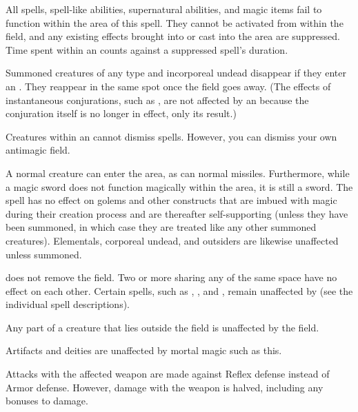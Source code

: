 \begin{spelleffect}
  All spells, spell-like abilities, supernatural abilities, and magic items fail to function within the area of this spell. They cannot be activated from within the field, and any existing effects brought into or cast into the area are suppressed. Time spent within an  counts against a suppressed spell's duration.
  \par Summoned creatures of any type and incorporeal undead disappear if they enter an . They reappear in the same spot once the field goes away. (The effects of instantaneous conjurations, such as , are not affected by an  because the conjuration itself is no longer in effect, only its result.)
  \par Creatures within an  cannot dismiss spells. However, you can dismiss your own antimagic field.
\end{spelleffect}
\begin{spellnotes}
  A normal creature can enter the area, as can normal missiles. Furthermore, while a magic sword does not function magically within the area, it is still a sword. The spell has no effect on golems and other constructs that are imbued with magic during their creation process and are thereafter self-supporting (unless they have been summoned, in which case they are treated like any other summoned creatures). Elementals, corporeal undead, and outsiders are likewise unaffected unless summoned.
  \par {} does not remove the field. Two or more  sharing any of the same space have no effect on each other. Certain spells, such as , , and , remain unaffected by  (see the individual spell descriptions).
  \par Any part of a creature that lies outside the field is unaffected by the field.
  \par Artifacts and deities are unaffected by mortal magic such as this. 
\end{spellnotes}

\spellrng{\rngclose}
\begin{spelleffect}
  Attacks with the affected weapon are made against Reflex defense instead of Armor defense. However, damage with the weapon is halved, including any bonuses to damage.
\end{spelleffect}

